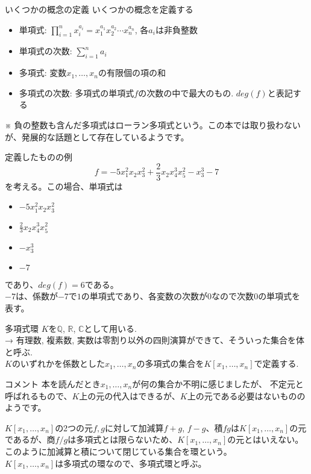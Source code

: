 \begin{frame} {いくつかの概念の定義}
	いくつかの概念を定義する
	\begin{itemize}
		\item 単項式: $\prod_{i=1}^n x_i^{a_i} = x_1^{a_1} x_2^{a_2} \cdots x_n^{a_n}$, 各$a_i$は非負整数
		\item 単項式の次数: $\sum_{i=1}^n a_i$
		\item 多項式: 変数$x_1,\ldots, x_n$の有限個の項の和
		\item 多項式の次数: 多項式の単項式$f$の次数の中で最大のもの. $deg(f)$と表記する
	\end{itemize}

	※ 負の整数も含んだ多項式はローラン多項式という。この本では取り扱わないが、発展的な話題として存在しているようです。
\end{frame}

\begin{frame} {定義したものの例}
	\begin{equation*}
		f = -5 x_1^2 x_2 x_3^2 + \frac{2}{3} x_2 x_4^3 x_5^2-x_3^3-7
	\end{equation*}
	を考える。この場合、単項式は
	\begin{itemize}
		\item $-5x_1^2x_2x_3^2 $
		\item $\frac{2}{3}x_2x_4^3 x_5^2$
		\item $-x_3^3$
		\item $-7$
	\end{itemize}
	であり、$deg(f)=6$である。 \\
	$-7$は、係数が$-7$で$1$の単項式であり、各変数の次数が0なので次数$0$の単項式を表す。
\end{frame}

\begin{frame} {多項式環}
	$K$を$\mathbb{Q}$, $\mathbb{R}$, $\mathbb{C}$として用いる. \\
	→ 有理数, 複素数, 実数は零割り以外の四則演算ができて、そういった集合を体と呼ぶ. \\
	$K$のいずれかを係数とした$x_1,\ldots,x_n$の多項式の集合を$K[x_1,\ldots,x_n]$で定義する.\\
	\begin{block}{コメント}
		本を読んだとき$x_1,\ldots,x_n$が何の集合か不明に感じましたが、
		不定元と呼ばれるもので、$K$上の元の代入はできるが、$K$上の元である必要はないもののようです。
	\end{block}

	$K[x_1,\ldots,x_n]$の2つの元$f,g$に対して加減算$f+g$, $f-g$、積$fg$は$K[x_1,\ldots,x_n]$の元であるが、商$f/g$は多項式とは限らないため、$K[x_1,\ldots,x_n]$の元とはいえない。このように加減算と積について閉じている集合を環という。\\
	$K[x_1,\ldots,x_n]$は多項式の環なので、多項式環と呼ぶ。

\end{frame}

